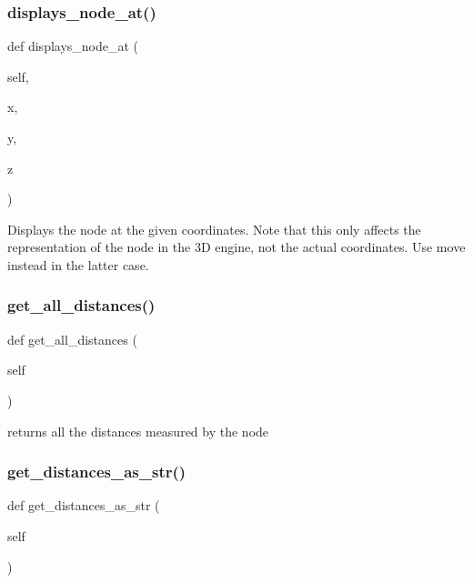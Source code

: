 \subsubsection{\texorpdfstring{displays\+\_\+node\+\_\+at()}{displays\_node\_at()}}
{\footnotesize\ttfamily def displays\+\_\+node\+\_\+at (\begin{DoxyParamCaption}\item[{}]{self,  }\item[{}]{x,  }\item[{}]{y,  }\item[{}]{z }\end{DoxyParamCaption})}

\begin{DoxyVerb}Displays the node at the given coordinates.
Note that this only affects the representation of the node in the 3D engine, not the actual coordinates.
Use move instead in the latter case.\end{DoxyVerb}
 \mbox{\label{class_rendering_1_1_rendered_node_a8497086c897585b6ee2234e8728e69e5}} 
\subsubsection{\texorpdfstring{get\+\_\+all\+\_\+distances()}{get\_all\_distances()}}
{\footnotesize\ttfamily def get\+\_\+all\+\_\+distances (\begin{DoxyParamCaption}\item[{}]{self }\end{DoxyParamCaption})}

\begin{DoxyVerb}returns all the distances measured by the node\end{DoxyVerb}
 \mbox{\label{class_rendering_1_1_rendered_node_a6a5edcc7b40b4e6cb4057afc9e6a4025}} 
\subsubsection{\texorpdfstring{get\+\_\+distances\+\_\+as\+\_\+str()}{get\_distances\_as\_str()}}
{\footnotesize\ttfamily def get\+\_\+distances\+\_\+as\+\_\+str (\begin{DoxyParamCaption}\item[{}]{self }\end{DoxyParamCaption})}

